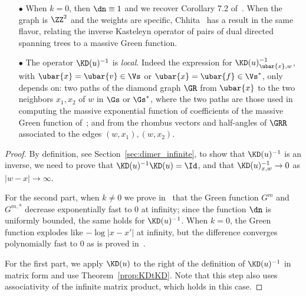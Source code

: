 \documentclass[a4paper,twoside,11pt]{article}
\begin{document}
\begin{rem}\label{rem:localKD_m_1}$\,$
\begin{itemize}
\item[$\bullet$] When $k=0$, then $\dn\equiv 1$ and we recover Corollary 7.2 of~\cite{Kenyon3}. When the graph 
is $\ZZ^2$ and the weights are specific, Chhita~\cite{Chhita} has a result in the same flavor, relating the inverse Kasteleyn 
operator of pairs of dual directed spanning trees to a massive Green function.
\item[$\bullet$] The operator $\KD(u)^{-1}$ is \emph{local}. Indeed the expression for $\KD(u)^{-1}_{\ubar{x},w}$, with $\ubar{x}=\ubar{v}\in \Vs$ or 
$\ubar{x}=\ubar{f}\in\Vs^*$, 
only depends on: two paths of the diamond graph $\GR$ from $\ubar{x}$ to the two neighbors $x_1,x_2$ of $w$ in $\Gs$ or $\Gs^*$,
where the two paths are those used in computing the massive exponential function of coefficients of the massive Green function of~\cite{BdTR1};
and from the rhombus vectors and half-angles of $\GRR$ associated to the edges $(w,x_1), (w,x_2)$. 
\end{itemize}
\end{rem}

\begin{proof}
By definition, see Section~\ref{sec:dimer_infinite}, to show that $\KD(u)^{-1}$ is an inverse, we need to prove that 
$\KD(u)^{-1}\KD(u)=\Id$, and that $\KD(u)^{-1}_{x,w}\rightarrow 0$ as $|w-x|\rightarrow \infty$. 

For the second part, when $k\neq 0$ we prove in~\cite{BdTR1} that the Green function $G^m$ and $G^{m,*}$ decrease exponentially fast
to 0 at infinity; since the function $\dn$ is uniformly bounded, the same holds for $\KD(u)^{-1}$. When $k=0$, the Green function 
explodes like $-\log|x-x'|$ at infinity, but the difference converges polynomially fast to 0 as is proved in~\cite{Kenyon3}. 

For the first part, we apply $\KD(u)$ to the right of the definition of $\KD(u)^{-1}$ in matrix form and use Theorem~\ref{prop:KDtKD}.
Note that this step also uses associativity of the infinite matrix product, which holds in this case.
\end{proof}
\end{document}
